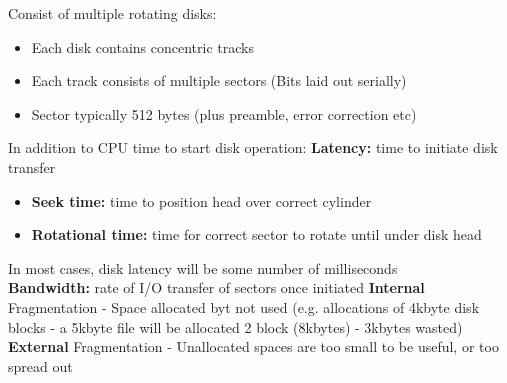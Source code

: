 \documentclass[number]{notes}
\begin{document}
\begin{landscape}
\begin{multicols}{3}
Consist of multiple rotating disks:
\begin{itemize}[nolistsep]
    \item Each disk contains concentric tracks
    \item Each track consists of multiple sectors (Bits laid out serially)
    \item Sector typically 512 bytes (plus preamble, error correction etc)
\end{itemize}
In addition to CPU time to start disk operation:
\textbf{Latency:} time to initiate disk transfer
\begin{itemize}[nolistsep]
    \item \textbf{Seek time:} time to position head over correct cylinder
    \item \textbf{Rotational time:} time for correct sector to rotate until under disk head
\end{itemize}
In most cases, disk latency will be some number of milliseconds\\
\textbf{Bandwidth:} rate of I/O transfer of sectors once initiated
\textbf{Internal} Fragmentation - Space allocated byt not used (e.g. allocations of 4kbyte disk blocks - a 5kbyte file will be allocated 2 block (8kbytes) - 3kbytes wasted)\\
\textbf{External} Fragmentation - Unallocated spaces are too small to be useful, or too spread out


\end{multicols}
\end{landscape}
\end{document}
